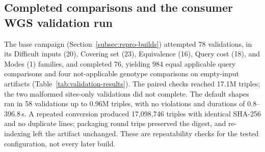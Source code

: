 \documentclass[11pt]{article}
\begin{document}
\subsection{Completed comparisons and the consumer WGS validation run}\label{subsec:validation-comparisons}
The base campaign (Section~\ref{subsec:repro-builds}) attempted 78 validations, in its Difficult inputs (20), Covering set (23), Equivalence (16), Query cost (18), and Modes (1) families, and completed 76, yielding 984 equal applicable query comparisons and four not-applicable genotype comparisons on empty-input artifacts (Table~\ref{tab:validation-results}).
The paired checks reached 17.1M triples; the two malformed sites-only validations did not complete.
The default shapes ran in 58 validations up to 0.96M triples, with no violations and durations of 0.8--396.8\,s.
A repeated conversion produced 17,098,746 triples with identical SHA-256 and no duplicate lines; packaging round trips preserved the digest, and re-indexing left the artifact unchanged.
These are repeatability checks for the tested configuration, not every later build.
\end{document}
